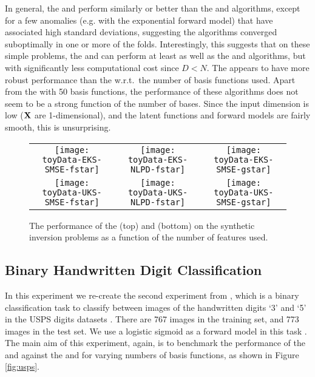 In general, the \eks and \uks perform similarly or better than the \egp and
\ugp algorithms, except for a few anomalies (e.g. \egp with the exponential
forward model) that have associated high standard deviations, suggesting the
algorithms converged suboptimally in one or more of the folds. Interestingly,
this suggests that on these simple problems, the \eks and \uks can perform at
least as well as the \egp and \uks algorithms, but with significantly less
computational cost since $D < N$. The \eks appears to have more robust
performance than the \uks w.r.t.\ the number of basis functions used. Apart
from the \uks with 50 basis functions, the performance of these algorithms does
not seem to be a strong function of the number of bases. Since the input
dimension is low ($\mathbf{X}$ are 1-dimensional), and the latent functions and
forward models are fairly smooth, this is unsurprising.

\begin{figure*}
\centering
\begin{tabular}{c c c}
\texttt{[image: toyData-EKS-SMSE-fstar]} &
\texttt{[image: toyData-EKS-NLPD-fstar]} &
\texttt{[image: toyData-EKS-SMSE-gstar]} \\
\texttt{[image: toyData-UKS-SMSE-fstar]} &
\texttt{[image: toyData-UKS-NLPD-fstar]} &
\texttt{[image: toyData-UKS-SMSE-gstar]} \\
\end{tabular}
\caption{The performance of the \eks (top) and \uks (bottom)
on the synthetic inversion problems as a function of the number of features used. 
\label{fig:toyinversions}
}
\end{figure*}
%
\subsection{Binary Handwritten Digit Classification}
In this experiment we re-create the second experiment from
\citet{steinberg-bonilla-nips-2014}, which is a binary classification task to
classify between images of the handwritten digits `3' and `5' in the USPS
digits datasets \cite{rasmussen-williams-book}. There are 767 images in the
training set, and 773 images in the test set. We use a logistic sigmoid as a
forward model in this task . The main
aim of this experiment, again, is to benchmark the performance of the \eks and
\uks against the \egp and \ugp for varying numbers of basis functions, as shown
in Figure \ref{fig:usps}. 

